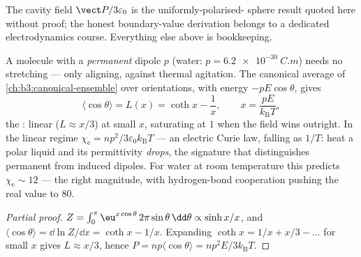 \begin{remark}
The cavity field $\vect P/3\varepsilon_0$ is the uniformly-polarised-%
sphere result quoted here without proof; the honest boundary-value
derivation belongs to a dedicated electrodynamics course. Everything
else above is bookkeeping.
\end{remark}

\begin{proposition}\label{prop:b3:electromagnetism-in-matter:langevin}
A molecule with a \emph{permanent} dipole $p$ (water:
$p = \qty{6.2e-30}{C.m}$) needs no stretching --- only aligning,
against thermal agitation. The canonical average of
\cref{ch:b3:canonical-ensemble} over orientations, with energy
$-pE\cos\theta$, gives
\[
\langle\cos\theta\rangle = L(x) = \coth x - \frac1x ,
\qquad x = \frac{pE}{k_{\text{B}}T} ,
\]
the \emph{}: linear ($L \approx x/3$) at small $x$,
saturating at $1$ when the field wins outright. In the linear regime
$\chi_{\text{e}} = np^2/3\varepsilon_0k_{\text{B}}T$ --- an electric
Curie law, falling as $1/T$: heat a polar liquid and its permittivity
\emph{drops}, the signature that distinguishes permanent from induced
dipoles. For water at room temperature this predicts
$\chi_{\text{e}} \sim 12$ --- the right magnitude, with hydrogen-bond
cooperation pushing the real value to $80$.
\end{proposition}

\begin{proof}[Partial proof]
$Z = \int_0^\pi \eu^{x\cos\theta}\,2\pi\sin\theta\,\dd\theta \propto
\sinh x/x$, and $\langle\cos\theta\rangle = \dd\ln Z/\dd x = \coth x
- 1/x$. Expanding $\coth x = 1/x + x/3 - \dots$ for small $x$ gives
$L \approx x/3$, hence $P = np\langle\cos\theta\rangle =
np^2E/3k_{\text{B}}T$.
\end{proof}

